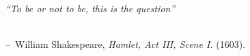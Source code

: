 \makeatletter
\newenvironment{chapquote}[2][-2.5em]
  {\setlength{\@tempdima}{#1}%
   \def\chapquote@author{#2}%
   \parshape 1 \@tempdima \dimexpr\textwidth-1\@tempdima\relax%
   \itshape}
  {\par\normalfont\hfill--\ \chapquote@author\hspace*{\@tempdima}\par\bigskip}
\makeatother

\vspace*{\fill}
\begin{chapquote}{William Shakespeare, \textit{Hamlet, Act III, Scene I.} (1603).} ``To be or not to be, this is the question''\\\\
\end{chapquote}
\vspace*{\fill} %

